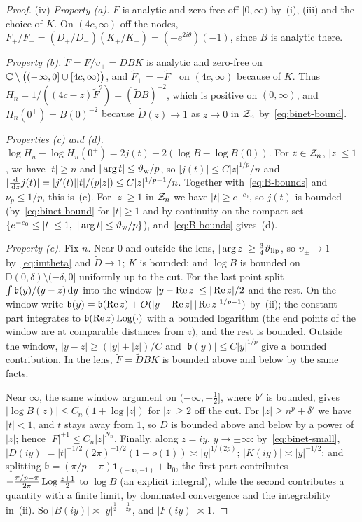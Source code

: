 \begin{proof}
(iv) \emph{Property (a).} $F$ is analytic and zero-free off $[0,\infty)$ by~(i), (iii) and the choice of $K$. On
$(4c,\infty)$ off the nodes, $F_+/F_-=(D_+/D_-)(K_+/K_-)=(-e^{2i\theta})(-1)$, since $B$ is analytic there.

\emph{Property (b).} $\tilde F=F/\upsilon_\pm=\tilde DBK$ is analytic and zero-free on $\mathbb{C}\setminus\bigl((-\infty,0]\cup[4c,\infty)\bigr)$,
and $\tilde F_+=-\tilde F_-$ on $(4c,\infty)$ because of $K$. Thus $H_n=1/((4c-z)\tilde F^2)=(\tilde DB)^{-2}$, which is
positive on $(0,\infty)$, and $H_n(0^+)=B(0)^{-2}$ because $\tilde D(z)\to1$ as $z\to0$ in $\mathcal{Z}_n$ by~\eqref{eq:binet-bound}.

\emph{Properties (c) and (d).} $\log H_n-\log H_n(0^+)=2j(t)-2(\log B-\log B(0))$. For $z\in\mathcal{Z}_n$, $|z|\le1$, we have $|t|\ge n$ and
$|\arg t|\le\vartheta_{\mathrm{w}}/p$, so $|j(t)|\le C|z|^{1/p}/n$ and $|\frac{\,\mathrm{d}}{\,\mathrm{d} z}j(t)|=|j'(t)||t|/(p|z|)\le C|z|^{1/p-1}/n$.
Together with~\eqref{eq:B-bounds} and $\nu_p\le1/p$, this is~(c). For $|z|\ge1$ in $\mathcal{Z}_n$ we have $|t|\ge e^{-c_0}$, so
$j(t)$ is bounded (by~\eqref{eq:binet-bound} for $|t|\ge1$ and by continuity on the compact set
$\{e^{-c_0}\le|t|\le1,\ |\arg t|\le\vartheta_{\mathrm{w}}/p\}$), and~\eqref{eq:B-bounds} gives~(d).

\emph{Property (e).} Fix $n$. Near $0$ and outside the lens, $|\arg z|\ge\frac34\vartheta_{\mathrm{lip}}$, so $\upsilon_\pm\to1$ by~\eqref{eq:imtheta}
and $\tilde D\to1$; $K$ is bounded; and $\log B$ is bounded on $\mathbb D(0,\delta)\setminus(-\delta,0]$ uniformly up to the cut.
For the last point split $\int\mathfrak b(y)/(y-z)\,\mathrm{d} y$ into the window $|y-\operatorname{Re} z|\le|\operatorname{Re} z|/2$ and the rest. On the
window write $\mathfrak b(y)=\mathfrak b(\operatorname{Re} z)+O(|y-\operatorname{Re} z|\,|\operatorname{Re} z|^{1/p-1})$ by~(ii); the constant part integrates to
$\mathfrak b(\operatorname{Re} z)\operatorname{Log}(\cdot)$ with a bounded logarithm (the end points of the window are at comparable distances from
$z$), and the rest is bounded. Outside the window, $|y-z|\ge(|y|+|z|)/C$ and $|\mathfrak b(y)|\le C|y|^{1/p}$ give a
bounded contribution. In the lens, $\tilde F=\tilde DBK$ is bounded above and below by the same facts.

Near $\infty$, the same window argument on $(-\infty,-\frac12]$, where $\mathfrak b'$ is bounded, gives
$|\log B(z)|\le C_n(1+\log|z|)$ for $|z|\ge2$ off the cut. For $|z|\ge n^p+\delta'$ we have $|t|<1$, and $t$ stays away from
$1$, so $D$ is bounded above and below by a power of $|z|$; hence $|F|^{\pm1}\le C_n|z|^{N_n}$. Finally, along $z=iy$,
$y\to\pm\infty$: by~\eqref{eq:binet-small}, $|D(iy)|=|t|^{-1/2}(2\pi)^{-1/2}(1+o(1))\asymp|y|^{1/(2p)}$; $|K(iy)|\asymp|y|^{-1/2}$;
and splitting $\mathfrak b=(\pi/p-\pi)\mathbf 1_{(-\infty,-1)}+\mathfrak b_0$, the first part contributes
$-\frac{\pi/p-\pi}{2\pi}\operatorname{Log}\frac{z+1}{2}$ to $\log B$ (an explicit integral), while the second contributes a quantity with
a finite limit, by dominated convergence and the integrability in~(ii). So $|B(iy)|\asymp|y|^{\frac12-\frac1{2p}}$, and
$|F(iy)|\asymp1$.
\end{proof}

